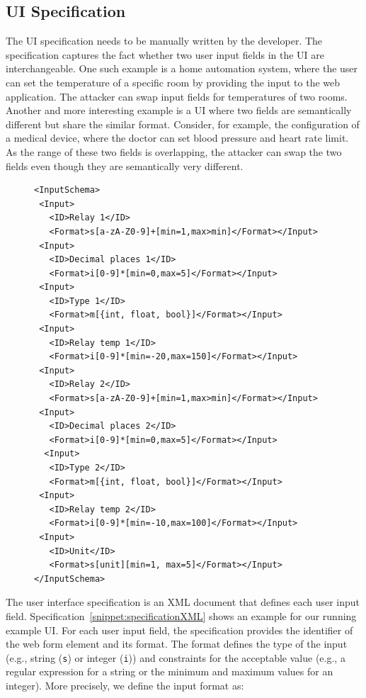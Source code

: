 \subsection{UI Specification} 
\label{sec:integriTool:specification}

The UI specification needs to be manually written by the developer. The specification captures the fact whether two user input fields in the UI are interchangeable. One such example is a home automation system, where the user can set the temperature of a specific room by providing the input to the web application. The attacker can swap input fields for temperatures of two rooms. Another and more interesting example is a UI where two fields are semantically different but share the similar format. Consider, for example, the configuration of a medical device, where the doctor can set blood pressure and heart rate limit. As the range of these two fields is overlapping, the attacker can swap the two fields even though they are semantically very different.

\begin{figure}[t]
\begin{lstlisting}[mathescape=true]
<InputSchema>
 <Input>
   <ID>Relay 1</ID>
   <Format>s[a-zA-Z0-9]+[min=1,max>min]</Format></Input>
 <Input>
   <ID>Decimal places 1</ID>
   <Format>i[0-9]*[min=0,max=5]</Format></Input>
 <Input>
   <ID>Type 1</ID>
   <Format>m[{int, float, bool}]</Format></Input>
 <Input>
   <ID>Relay temp 1</ID>
   <Format>i[0-9]*[min=-20,max=150]</Format></Input>
 <Input>
   <ID>Relay 2</ID>
   <Format>s[a-zA-Z0-9]+[min=1,max>min]</Format></Input>
 <Input>
   <ID>Decimal places 2</ID>
   <Format>i[0-9]*[min=0,max=5]</Format></Input>
  <Input>
   <ID>Type 2</ID>
   <Format>m[{int, float, bool}]</Format></Input>
 <Input>
   <ID>Relay temp 2</ID>
   <Format>i[0-9]*[min=-10,max=100]</Format></Input>
 <Input>
   <ID>Unit</ID>
   <Format>s[unit][min=1, max=5]</Format></Input>
</InputSchema>
\end{lstlisting} 
\end{figure}

The user interface specification is an XML document that defines each user input field. Specification~\ref{snippet:specificationXML} shows an example for our running example UI. For each user input field, the specification provides the identifier of the web form element and its format. The format defines the type of the input (e.g., string (\texttt{s}) or integer (\texttt{i})) and constraints for the acceptable value (e.g., a regular expression for a string or the minimum and maximum values for an integer).
More precisely, we define the input format as:%

